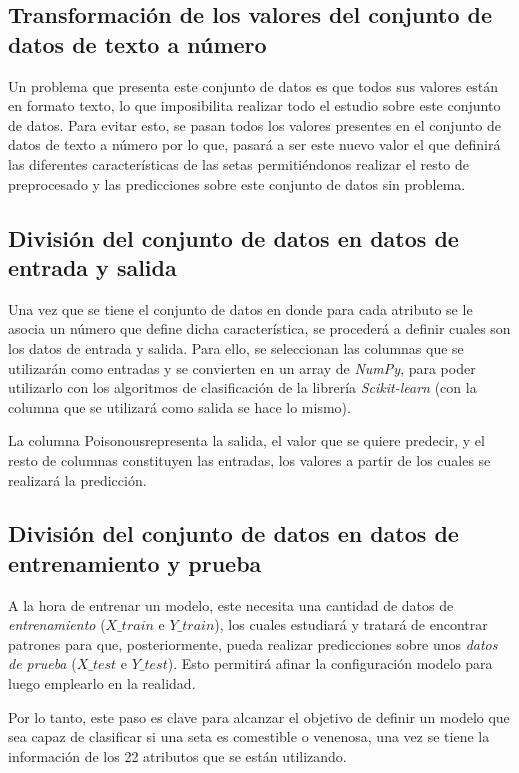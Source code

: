 \documentclass{Plantilla/Formato_EPEF}
\begin{document}
\subsection{Transformación de los valores del conjunto de datos de texto a número}


Un problema que presenta este conjunto de datos es que todos sus valores están en formato texto, lo que imposibilita realizar todo el estudio sobre este conjunto de datos. Para evitar esto, se pasan todos los valores presentes en el conjunto de datos de texto a número por lo que, pasará a ser este nuevo valor el que definirá las diferentes características de las setas permitiéndonos realizar el resto de preprocesado y las predicciones sobre este conjunto de datos sin problema.

\subsection{División del conjunto de datos en datos de entrada y salida}

Una vez que se tiene el conjunto de datos en donde para cada atributo se le asocia un número que define dicha característica, se procederá a definir cuales son los datos de entrada y salida. Para ello, se seleccionan las columnas que se utilizarán como entradas y se convierten en un array de \textit{NumPy}, para poder utilizarlo con los algoritmos de clasificación de la librería \textit{Scikit-learn} (con la columna que se utilizará como salida se hace lo mismo). 

La columna \textgravedbl Poisonous\textacutedbl representa la salida, el valor que se quiere predecir, y el resto de columnas constituyen las entradas, los valores a partir de los cuales se realizará la predicción.
	
\subsection{División del conjunto de datos en datos de entrenamiento y prueba}
A la hora de entrenar un modelo, este necesita una cantidad de datos de \textit{entrenamiento} ($X\_train$ e $Y\_train$), los cuales estudiará y tratará de encontrar patrones para que, posteriormente, pueda realizar predicciones sobre unos \textit{datos de prueba} ($X\_test$ e $Y\_test$). Esto permitirá afinar la configuración modelo para luego emplearlo en la realidad.
 
Por lo tanto, este paso es clave para alcanzar el objetivo de definir un modelo que sea capaz de clasificar si una seta es comestible o venenosa, una vez se tiene la información de los 22 atributos que se están utilizando.  
\end{document}
